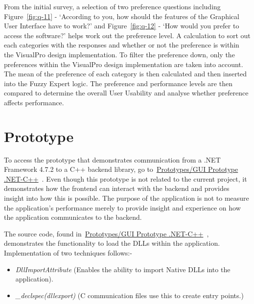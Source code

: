 \documentclass[12pt]{report} %
\begin{document}
	From the initial survey, a selection of two preference questions including Figure~\ref{fig:q-11} - `According to you, how should the features of the Graphical User Interface have to work?' and Figure~\ref{fig:q-12} - `How would you prefer to access the software?' helps work out the preference level. A calculation to sort out each categories with the responses and whether or not the preference is within the VisualPro design implementation. To filter the preference down, only the preferences within the VisualPro design implementation are taken into account. The mean of the preference of each category is then calculated and then inserted into the Fuzzy Expert logic. The preference and performance levels are then compared to determine the overall User Usability and analyse whether preference affects performance.
	
\chapter{Prototype}
\label{chap:prototype}
	To access the prototype that demonstrates communication from a .NET Framework 4.7.2 to a C++ backend library, go to~\href{https://github.com/ShinkuKira21/VisualPro-FinalProject/tree/main/Prototypes/GUI%20Concept%20.NET-C%2B%2B/Package}{Prototypes/GUI Prototype .NET-C++}~\cite{patch_visualpro_2022}. Even though this prototype is not related to the current project, it demonstrates how the frontend can interact with the backend and provides insight into how this is possible. The purpose of the application is not to measure the application's performance merely to provide insight and experience on how the application communicates to the backend.

	The source code, found in~\href{https://github.com/ShinkuKira21/VisualPro-FinalProject/tree/main/Prototypes/GUI%20Concept%20.NET-C%2B%2B/Source%20Code}{Prototypes/GUI Prototype .NET-C++}~\cite{patch_visualpro_2022}, demonstrates the functionality to load the DLLs within the application. Implementation of two techniques follows:-
	\begin{itemize}
		\item \textit{DllImportAttribute} (Enables the ability to import Native DLLs into the application).
		\item \textit{\_declspec(dllexport)} (C communication files use this to create entry points.)
	\end{itemize}
\end{document}
